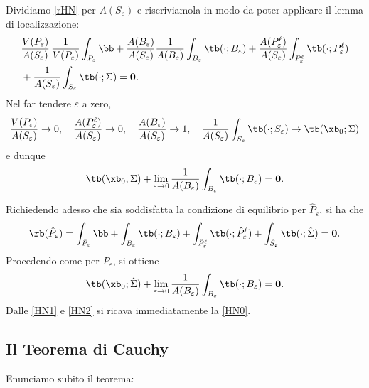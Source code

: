 Dividiamo \eqref{rHN} per $A(S_\varepsilon)$ e riscriviamola in modo da poter applicare il lemma di localizzazione:
\begin{equation}
\begin{aligned}
&\frac{V(P_\varepsilon)}{A(S_\varepsilon)}\, \frac{1}{V(P_\varepsilon)}\int_{P_\varepsilon}\bb+
\frac{A(B_\varepsilon)}{A(S_\varepsilon)}\frac{1}{A(B_\varepsilon)}\int_{B_\varepsilon}\tb(\cdot ;B_\varepsilon)+\frac{A(P^\ell_\varepsilon)}{A(S_\varepsilon)}\int_{P^\ell_\varepsilon}\tb(\cdot ;P^\ell_\varepsilon)\\
&+\frac{1}{A(S_\varepsilon)}\int_{S_\varepsilon}\tb(\cdot; \Sigma)=\mathbf{0}.
\end{aligned}
\end{equation}
Nel far tendere $\varepsilon$ a zero, 
\begin{equation}
	\frac{V(P_\varepsilon)}{A(S_\varepsilon)}\to 0, \quad \frac{A(P^\ell_\varepsilon)}{A(S_\varepsilon)}\to 0, \quad \frac{A(B_\varepsilon)}{A(S_\varepsilon)}\to 1,\quad \frac{1}{A(S_\varepsilon)}\int_{S_\varepsilon}\tb(\cdot; S_\varepsilon)\to \tb(\xb_0; \Sigma)
\end{equation}
e dunque
\begin{equation}\label{HN1}
\tb(\xb_0; \Sigma)+\lim_{\varepsilon\to 0}\frac{1}{A(B_\varepsilon)}\int_{B_\varepsilon}\tb(\cdot ;B_\varepsilon)=\mathbf{0}.
\end{equation}

Richiedendo adesso che sia soddisfatta la condizione di equilibrio per $\hat P_\varepsilon$, si ha che 
\begin{equation}
\rb(\hat P_\varepsilon)=\int_{\hat P_\varepsilon}\bb+\int_{ B_\varepsilon}\tb(\cdot;  B_\varepsilon)+\int_{\hat P^\ell_\varepsilon}\tb(\cdot; \hat P^\ell_\varepsilon)+\int_{\hat S_\varepsilon}\tb(\cdot; \hat{\Sigma})=\mathbf{0}.
\end{equation}
Procedendo come per $P_\varepsilon$, si ottiene
\begin{equation}\label{HN2}
	\tb(\xb_0; \hat\Sigma)+\lim_{\varepsilon\to 0}\frac{1}{A(B_\varepsilon)}\int_{B_\varepsilon}\tb(\cdot ;B_\varepsilon)=\mathbf{0}.
\end{equation}
Dalle \eqref{HN1} e \eqref{HN2}  si ricava immediatamente la \eqref{HN0}.


\subsection{Il Teorema di Cauchy}
Enunciamo subito il teorema: 


